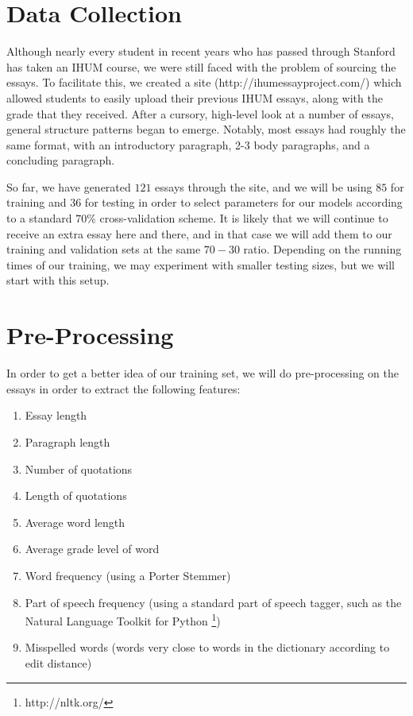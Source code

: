 \documentclass[11pt,twocolumn]{scrartcl}
\begin{document}
\section{Data Collection}

Although nearly every student in recent years who has passed through Stanford has taken an IHUM course, we were still faced with the problem of sourcing the essays. To facilitate this, we created a site (http://ihumessayproject.com/) which allowed students to easily upload their previous IHUM essays, along with the grade that they received. After a cursory, high-level look at a number of essays, general structure patterns began to emerge. Notably, most essays had roughly the same format, with an introductory paragraph, 2-3 body paragraphs, and a concluding paragraph. 

So far, we have generated $121$ essays through the site, and we will be using $85$ for training and $36$ for testing in order to select parameters for our models according to a standard $70\%$ cross-validation scheme. It is likely that we will continue to receive an extra essay here and there, and in that case we will add them to our training and validation sets at the same $70-30$ ratio. Depending on the running times of our training, we may experiment with smaller testing sizes, but we will start with this setup.

\section{Pre-Processing}
In order to get a better idea of our training set, we will do pre-processing on the essays in order to extract the following features:

\begin{enumerate}
  \item Essay length
  \item Paragraph length
  \item Number of quotations
  \item Length of quotations
  \item Average word length
  \item Average grade level of word
  \item Word frequency (using a Porter Stemmer)
  \item Part of speech frequency (using a standard part of speech tagger, such as the Natural Language Toolkit for Python \footnote{http://nltk.org/})
  \item Misspelled words (words very close to words in the dictionary according to edit distance)
\end{enumerate}
\end{document}
